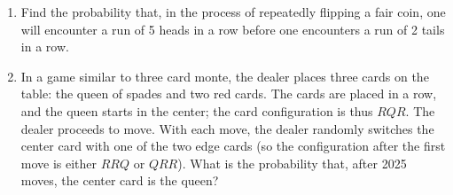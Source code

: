 \documentclass[10pt, oneside]{article}
\theoremstyle{definition}
\begin{document}
\begin{enumerate}
    \item Find the probability that, in the process of repeatedly flipping a fair coin, one will encounter a run of 5 heads in a row before one encounters a run of 2 tails in a row.
    \begin{solution}
        
    \end{solution}

    \item In a game similar to three card monte, the dealer places three cards on the table: the queen of spades and two red cards. The cards are placed in a row, and the queen starts in the center; the card configuration is thus $RQR$. The dealer proceeds to move. With each move, the dealer randomly switches the center card with one of the two edge cards (so the configuration after the first move is either $RRQ$ or $QRR$). What is the probability that, after 2025 moves, the center card is the queen?
\end{enumerate}
\end{document}
